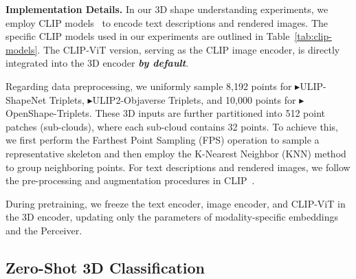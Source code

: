 \documentclass{article}
\newcommand{\clipvit}{CLIP-ViT\xspace}
\newcommand{\dsA}{\textcolor{myyellow}{$\blacktriangleright$}}
\newcommand{\dsB}{{\textcolor{mygreen}{$\blacktriangleright$}}}
\newcommand{\dsC}{{\textcolor{mypurpledeep}{$\blacktriangleright$}}}
\begin{document}
\textbf{Implementation Details.}
In our 3D shape understanding experiments, we employ CLIP models~\cite{openai_clip,cherti2022openclip} to encode text descriptions and rendered images. The specific CLIP models used in our experiments are outlined in Table~\ref{tab:clip-models}. The \clipvit version, serving as the CLIP image encoder, is directly integrated into the 3D encoder \textit{\textbf{by default}}.


Regarding data preprocessing, we uniformly sample 8,192 points for \dsA ULIP-ShapeNet Triplets, \dsB ULIP2-Objaverse Triplets, and 10,000 points for \dsC OpenShape-Triplets. These 3D inputs are further partitioned into 512 point patches (sub-clouds), where each sub-cloud contains 32 points. To achieve this, we first perform the Farthest Point Sampling (FPS) operation to sample a representative skeleton and then employ the K-Nearest Neighbor (KNN) method to group neighboring points.
For text descriptions and rendered images, we follow the pre-processing and augmentation procedures in CLIP~\cite{openai_clip,cherti2022openclip}. 

During pretraining, we freeze the text encoder, image encoder, and \clipvit in the 3D encoder, updating only the parameters of modality-specific embeddings and the Perceiver.


\subsection{Zero-Shot 3D Classification}
\end{document}
